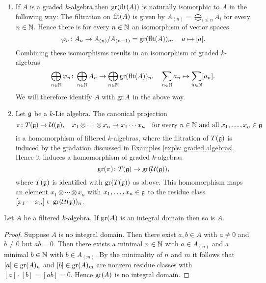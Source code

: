 \begin{expls}
 \begin{enumerate}[leftmargin=*]
  \item
   If $A$ is a graded $k$-algebra then $\operatorname{gr}(\operatorname{flt}(A))$ is naturally isomorphic to $A$ in the following way: The filtration on $\operatorname{flt}(A)$ is given by $A_{(n)} = \bigoplus_{i \leq n} A_i$ for every $n \in \mathbb{N}$. Hence there is for every $n \in \mathbb{N}$ an isomorphism of vector spaces
   \[
    \varphi_n \colon A_n \to A_{(n)}/A_{(n-1)} = \operatorname{gr}(\operatorname{flt}(A))_n, \quad a \mapsto [a].
   \]
   Combining these isomorphisms results in an isomorphism of graded $k$-algebras
   \[
    \bigoplus_{n \in \mathbb{N}} \varphi_n \colon
    \bigoplus_{n \in \mathbb{N}} A_n \to \bigoplus_{n \in \mathbb{N}} \operatorname{gr}(\operatorname{flt}(A))_n, \quad
    \sum_{n \in \mathbb{N}} a_n \mapsto \sum_{n \in \mathbb{N}} [a_n].
   \]
   We will therefore identify $A$ with $\operatorname{gr} A$ in the above way.
  \item
   Let $\mathfrak{g}$ be a $k$-Lie algebra. The canonical projection
   \[
    \pi \colon T(\mathfrak{g}) \to \mathcal{U}(\mathfrak{g}), \quad x_1 \otimes \dotsb \otimes x_n \to x_1 \dotsm x_n
    \quad \text{for every $n \in \mathbb{N}$ and all $x_1, \dotsc, x_n \in \mathfrak{g}$}
   \]
   is a homomorphism of filtered $k$-algebras, where the filtration of $T(\mathfrak{g})$ is induced by the gradation discussed in Examples \ref{expls: graded algebras}. Hence it induces a homomorphism of graded $k$-algebras
   \[
    \operatorname{gr}(\pi) \colon T(\mathfrak{g}) \to \operatorname{gr}(\mathcal{U}(\mathfrak{g})),
   \]
   where $T(\mathfrak{g})$ is identified with $\operatorname{gr}(T(\mathfrak{g}))$ as above. This homomorphism maps an element $x_1 \otimes \dotsb \otimes x_n$ with $x_1, \dots, x_n \in \mathfrak{g}$ to the residue class $[x_1 \dotsm x_n] \in \operatorname{gr}(\mathcal{U}(\mathfrak{g}))_n$.
 \end{enumerate}
\end{expls}


\begin{prop}\label{prop: associated graded algebra and zero divisors}
 Let $A$ be a filtered $k$-algebra. If $\operatorname{gr}(A)$ is an integral domain then so is $A$.
\end{prop}
\begin{proof}
 Suppose $A$ is no integral domain. Then there exist $a,b \in A$ with $a \neq 0$ and $b \neq 0$ but $ab = 0$. Then there exists a minimal $n \in \mathbb{N}$ with $a \in A_{(n)}$ and a minimal $b \in \mathbb{N}$ with $b \in A_{(m)}$. By the minimality of $n$ and $m$ it follows that $[a] \in \operatorname{gr}(A)_n$ and $[b] \in \operatorname{gr}(A)_m$ are nonzero residue classes with $[a] \cdot [b] = [ab] = 0$. Hence $\operatorname{gr}(A)$ is no integral domain.
\end{proof}



